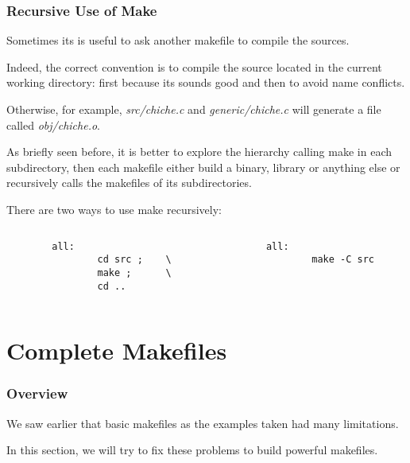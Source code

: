 \documentclass[8pt]{beamer}
\newcommand{\nl}[0]{\vspace{0.4cm}}
\begin{document}
\begin{frame}[containsverbatim]
  \frametitle{Recursive Use of Make}

  Sometimes its is useful to ask another makefile to compile the sources.

  \nl

  Indeed, the correct convention is to compile the source located in
  the current working directory: first because its sounds good and then
  to avoid name conflicts.

  \nl

  Otherwise, for example, \textit{src/chiche.c} and \textit{generic/chiche.c}
  will generate a file called \textit{obj/chiche.o}.

  \nl

  As briefly seen before, it is better to explore the hierarchy calling
  make in each subdirectory, then each makefile either build a binary, library
  or anything else or recursively calls the makefiles of its subdirectories.

  \nl

  There are two ways to use make recursively:

  \begin{columns}

    \begin{column}{6cm}
      \begin{verbatim}
        all:
                cd src ;    \
                make ;      \
                cd ..
      \end{verbatim}
    \end{column}

    \begin{column}{6cm}
      \begin{verbatim}
        all:
                make -C src
      \end{verbatim}
    \end{column}
  \end{columns}
\end{frame}

%
%

\section{Complete Makefiles}


\begin{frame}
  \frametitle{Overview}

  We saw earlier that basic makefiles as the examples taken had
  many limitations.

  \nl

  In this section, we will try to fix these problems to build powerful
  makefiles.
\end{frame}
\end{document}
